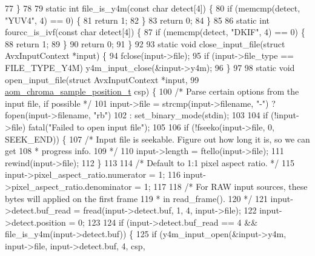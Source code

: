 \begin{DoxyCodeInclude}
77 \}
78 
79 \textcolor{keyword}{static} \textcolor{keywordtype}{int} file\_is\_y4m(\textcolor{keyword}{const} \textcolor{keywordtype}{char} detect[4]) \{
80   \textcolor{keywordflow}{if} (memcmp(detect, \textcolor{stringliteral}{"YUV4"}, 4) == 0) \{
81     \textcolor{keywordflow}{return} 1;
82   \}
83   \textcolor{keywordflow}{return} 0;
84 \}
85 
86 \textcolor{keyword}{static} \textcolor{keywordtype}{int} fourcc\_is\_ivf(\textcolor{keyword}{const} \textcolor{keywordtype}{char} detect[4]) \{
87   \textcolor{keywordflow}{if} (memcmp(detect, \textcolor{stringliteral}{"DKIF"}, 4) == 0) \{
88     \textcolor{keywordflow}{return} 1;
89   \}
90   \textcolor{keywordflow}{return} 0;
91 \}
92 
93 \textcolor{keyword}{static} \textcolor{keywordtype}{void} close\_input\_file(\textcolor{keyword}{struct} AvxInputContext *input) \{
94   fclose(input->file);
95   \textcolor{keywordflow}{if} (input->file\_type == FILE\_TYPE\_Y4M) y4m\_input\_close(&input->y4m);
96 \}
97 
98 \textcolor{keyword}{static} \textcolor{keywordtype}{void} open\_input\_file(\textcolor{keyword}{struct} AvxInputContext *input,
99                             \hyperlink{aom__image_8h_a48f259fc7774b1c799b3ebe7530c19bd}{aom\_chroma\_sample\_position\_t} csp) \{
100   \textcolor{comment}{/* Parse certain options from the input file, if possible */}
101   input->file = strcmp(input->filename, \textcolor{stringliteral}{"-"}) ? fopen(input->filename, \textcolor{stringliteral}{"rb"})
102                                              : set\_binary\_mode(stdin);
103 
104   \textcolor{keywordflow}{if} (!input->file) fatal(\textcolor{stringliteral}{"Failed to open input file"});
105 
106   \textcolor{keywordflow}{if} (!fseeko(input->file, 0, SEEK\_END)) \{
107     \textcolor{comment}{/* Input file is seekable. Figure out how long it is, so we can get}
108 \textcolor{comment}{     * progress info.}
109 \textcolor{comment}{     */}
110     input->length = ftello(input->file);
111     rewind(input->file);
112   \}
113 
114   \textcolor{comment}{/* Default to 1:1 pixel aspect ratio. */}
115   input->pixel\_aspect\_ratio.numerator = 1;
116   input->pixel\_aspect\_ratio.denominator = 1;
117 
118   \textcolor{comment}{/* For RAW input sources, these bytes will applied on the first frame}
119 \textcolor{comment}{   *  in read\_frame().}
120 \textcolor{comment}{   */}
121   input->detect.buf\_read = fread(input->detect.buf, 1, 4, input->file);
122   input->detect.position = 0;
123 
124   \textcolor{keywordflow}{if} (input->detect.buf\_read == 4 && file\_is\_y4m(input->detect.buf)) \{
125     \textcolor{keywordflow}{if} (y4m\_input\_open(&input->y4m, input->file, input->detect.buf, 4, csp,

\end{DoxyCodeInclude}
